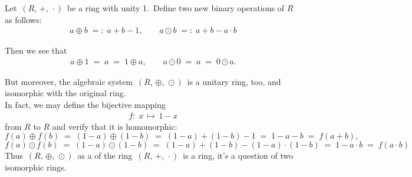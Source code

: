 \documentclass[12pt]{article}
\theoremstyle{definition}
\begin{document}
Let\, $(R,\,+,\,\cdot)$\, be a ring with unity 1.\, Define two new binary operations of $R$ as follows:
\begin{align}
a\!\oplus\!b \;=:\; a\!+\!b\!-\!1, \qquad a\odot\!b \;=:\; a\!+\!b\!-\!a\!\cdot\!b
\end{align}

Then we see that
\begin{align}
a\!\oplus\!1 \;=\; a \;=\; 1\!\oplus\!a, \qquad a\!\odot\!0 \;=\; a \;=\; 0\!\odot\!a.
\end{align}

But moreover, the algebraic system \,$(R,\,\oplus,\,\odot)$\, is a unitary ring, too, and isomorphic with the original ring.\\

In fact, we may define the bijective mapping
\begin{align}
f\!:\; x \,\mapsto\, 1\!-\!x
\end{align}
from $R$ to $R$ and verify that it is homomorphic:
$$f(a)\!\oplus\!f(b) \;=\; (1\!-\!a)\!\oplus\!(1\!-\!b) \;=\; (1\!-\!a)\!+\!(1\!-\!b)\!-\!1
\;=\; 1\!-\!a\!-\!b   \;=\; f(a\!+\!b),$$
$$f(a)\!\odot\!f(b) \;=\; (1\!-\!a)\!\odot\!(1\!-\!b) \;=\; 
(1\!-\!a)\!+\!(1\!-\!b)\!-(1\!-\!a)\!\cdot\!(1\!-\!b) \;=\; 1\!-\!a\!\cdot\!b \;=\; f(a\!\cdot\!b)$$
Thus\, $(R,\,\oplus,\,\odot)$\, as a  of the ring\, $(R,\,+,\,\cdot)$\, is a ring, it's a question of two isomorphic rings.







\end{document}
